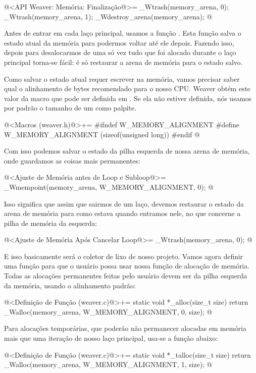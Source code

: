 \iniciocodigo
@<API Weaver: Memória: Finalização@>=
_Wtrash(memory_arena, 0);
_Wtrash(memory_arena, 1);
_Wdestroy_arena(memory_arena);
@
\fimcodigo

Antes de entrar em cada laço principal, usamos a
função . Esta função salva o estado atual da
memória para podermos voltar até ele depois. Fazendo isso, depois para
desalocarmos de uma só vez tudo que foi alocado durante o laço
principal torna-se fácil: é só restaurar a arena de memória para o
estado salvo.

Como salvar o estado atual requer escrever na memória, vamos precisar
saber qual o alinhamento de bytes recomendado para o nosso CPU. Weaver
obtém este valor da macro  que pode
ser definida em . Se ela não estiver definida,
nós usamos por padrão o tamanho de um  como
palpite.

\iniciocodigo
@<Macros (weaver.h)@>+=
#ifndef W_MEMORY_ALIGNMENT
#define W_MEMORY_ALIGNMENT (sizeof(unsigned long))
#endif
@
\fimcodigo

Com isso podemos salvar o estado da pilha esquerda de nossa arena de
memória, onde guardamos as coisas mais permanentes:

\iniciocodigo
@<Ajuste de Memória antes de Loop e Subloop@>=
_Wmempoint(memory_arena, W_MEMORY_ALIGNMENT, 0);
@
\fimcodigo

Isso significa que assim que sairmos de um laço, devemos restaurar o
estado da arena de memória para como estava quando entramos nele, no
que concerne a pilha de memória da esquerda:

\iniciocodigo
@<Ajuste de Memória Após Cancelar Loop@>=
_Wtrash(memory_arena, 0);
@
\fimcodigo

E isso basicamente será o coletor de lixo de nosso projeto. Vamos
agora definir uma função para que o usuário possa usar nossa função de
alocação de memória. Todas as alocações permanentes feitas pelo
usuário devem ser da pilha esquerda da memória, usando o alinhamento
padrão:

\iniciocodigo
@<Definição de Função (weaver.c)@>+=
static void *_alloc(size_t size){
  return _Walloc(memory_arena, W_MEMORY_ALIGNMENT, 0, size);
}
@
\fimcodigo

Para alocações temporárias, que poderão não permanecer alocadas em
memória mais que uma iteração de nosso laço principal, usa-se a função
abaixo:

\iniciocodigo
@<Definição de Função (weaver.c)@>+=
static void *_talloc(size_t size){
  return _Walloc(memory_arena, W_MEMORY_ALIGNMENT, 1, size);
}
@
\fimcodigo


